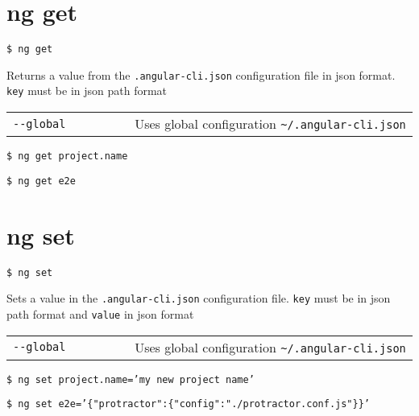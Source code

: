 \documentclass[8pt]{extarticle} %
\begin{document}
\begin{multicols}{3}
\section*{ng get}

  \vspace{1ex}
  {\tt \$ ng get }

  \vspace{0.6ex}

  {\small Returns a value from the {\tt .angular-cli.json} configuration file in json format. {\tt key} must be in json path format}

  \vspace{0.6ex}

  \begin{tabular}{L{0.30\linewidth} L{0.70\linewidth}}
    \tt -{}-global  & \small Uses global configuration {\tt \textasciitilde/.angular-cli.json}
  \end{tabular}

  \vspace{0.6ex}

  {\tt \$ ng get project.name}

  {\tt \$ ng get e2e}

\section*{ng set}

  \vspace{1ex}
  {\tt \$ ng set }

  \vspace{0.6ex}

  {\small Sets a value in the {\tt .angular-cli.json} configuration file. {\tt key} must be in json path format and {\tt value} in json format}

  \vspace{0.6ex}

  \begin{tabular}{L{0.30\linewidth} L{0.70\linewidth}}
    \tt -{}-global  & \small Uses global configuration {\tt \textasciitilde/.angular-cli.json}
  \end{tabular}

  \vspace{0.6ex}

  {\tt \$ ng set project.name='my new project name'}

  {\small {\tt \$ ng set e2e='\{"protractor":\{"config":"./protractor.conf.js"\}\}'}}


\end{multicols}
\end{document}
